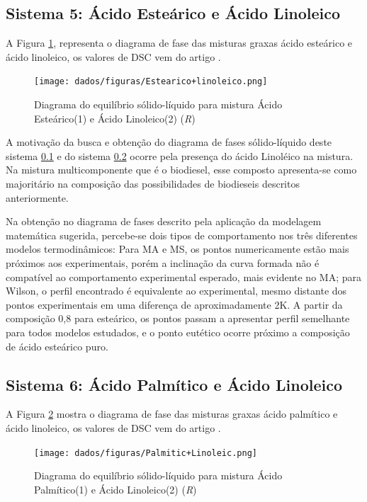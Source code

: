 \subsection{Sistema 5: Ácido Esteárico e Ácido Linoleico}\label{sistema6}

A Figura \ref{fig:18}, representa o diagrama de fase das misturas graxas ácido esteárico e ácido linoleico, os valores de DSC vem do artigo \cite{Eckert2016}.

\begin{figure}[H]
	\centering
	\texttt{[image: dados/figuras/Estearico+linoleico.png]}
	\caption[Diagrama do equilíbrio sólido-líquido para mistura Ácido Esteárico e Ácido Linoleico]{Diagrama do equilíbrio sólido-líquido para mistura Ácido Esteárico(1) e Ácido Linoleico(2) (\textit{R})}
	\label{fig:18}
\end{figure}

A motivação da busca e obtenção do diagrama de fases sólido-líquido deste sistema \ref{sistema6} e do sistema \ref{sistema7} ocorre pela presença do ácido Linoléico na mistura. Na mistura multicomponente que é o biodiesel, esse composto apresenta-se como majoritário na composição das possibilidades de biodieseis descritos anteriormente.

Na obtenção no diagrama de fases descrito pela aplicação da modelagem matemática sugerida, percebe-se dois tipos de comportamento nos três diferentes modelos termodinâmicos: Para MA e MS, os pontos numericamente estão mais próximos aos experimentais, porém a inclinação da curva formada não é compatível ao comportamento experimental esperado, mais evidente no MA; para Wilson, o perfil encontrado é equivalente ao experimental, mesmo distante dos pontos experimentais em uma diferença de aproximadamente 2K. A partir da composição 0,8 para esteárico, os pontos passam a apresentar perfil semelhante para todos modelos estudados, e o ponto eutético ocorre próximo a composição de ácido esteárico puro.

\subsection{Sistema 6: Ácido Palmítico e Ácido Linoleico}\label{sistema7}

A Figura \ref{fig:19} mostra o diagrama de fase das misturas graxas ácido palmítico e ácido linoleico, os valores de DSC vem do artigo \cite{Eckert2016}.

\begin{figure}[H]
	\centering
	\texttt{[image: dados/figuras/Palmitic+Linoleic.png]}
	\caption[Diagrama do equilíbrio sólido-líquido para mistura Ácido Palmítico e Ácido Linoleico]{Diagrama do equilíbrio sólido-líquido para mistura Ácido Palmítico(1) e Ácido Linoleico(2) (\textit{R})}
	\label{fig:19}
\end{figure}

